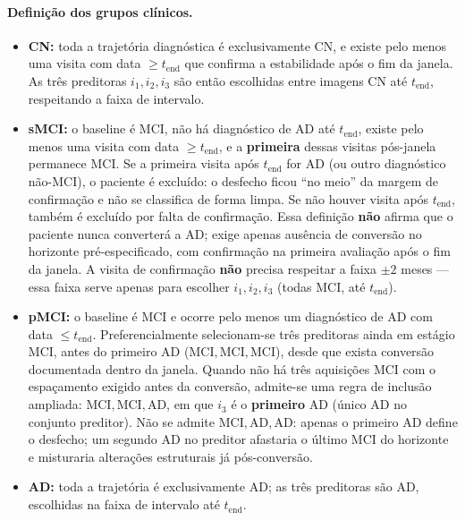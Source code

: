 \documentclass[review]{elsarticle}
\begin{document}
	\paragraph{Definição dos grupos clínicos.}
	\begin{itemize}
		\item \textbf{CN:} toda a trajetória diagnóstica é exclusivamente CN, e existe pelo menos uma visita com data $\ge t_{\mathrm{end}}$ que confirma a estabilidade após o fim da janela.
		As três preditoras $i_1,i_2,i_3$ são então escolhidas entre imagens CN até $t_{\mathrm{end}}$, respeitando a faixa de intervalo.
		
		\item \textbf{sMCI:} o baseline é MCI, não há diagnóstico de AD até $t_{\mathrm{end}}$, existe pelo menos uma visita com data $\ge t_{\mathrm{end}}$, e a \textbf{primeira} dessas visitas pós-janela permanece MCI.
		Se a primeira visita após $t_{\mathrm{end}}$ for AD (ou outro diagnóstico não-MCI), o paciente é excluído: o desfecho ficou ``no meio'' da margem de confirmação e não se classifica de forma limpa.
		Se não houver visita após $t_{\mathrm{end}}$, também é excluído por falta de confirmação.
		Essa definição \textbf{não} afirma que o paciente nunca converterá a AD; exige apenas ausência de conversão no horizonte pré-especificado, com confirmação na primeira avaliação após o fim da janela.
		A visita de confirmação \textbf{não} precisa respeitar a faixa $\pm 2$ meses --- essa faixa serve apenas para escolher $i_1,i_2,i_3$ (todas MCI, até $t_{\mathrm{end}}$).
		
		\item \textbf{pMCI:} o baseline é MCI e ocorre pelo menos um diagnóstico de AD com data $\le t_{\mathrm{end}}$.
		Preferencialmente selecionam-se três preditoras ainda em estágio MCI, antes do primeiro AD ($\mathrm{MCI},\mathrm{MCI},\mathrm{MCI}$), desde que exista conversão documentada dentro da janela.
		Quando não há três aquisições MCI com o espaçamento exigido antes da conversão, admite-se uma regra de inclusão ampliada: $\mathrm{MCI},\mathrm{MCI},\mathrm{AD}$, em que $i_3$ é o \textbf{primeiro} AD (único AD no conjunto preditor).
		Não se admite $\mathrm{MCI},\mathrm{AD},\mathrm{AD}$: apenas o primeiro AD define o desfecho; um segundo AD no preditor afastaria o último MCI do horizonte e misturaria alterações estruturais já pós-conversão.
		
		\item \textbf{AD:} toda a trajetória é exclusivamente AD; as três preditoras são AD, escolhidas na faixa de intervalo até $t_{\mathrm{end}}$.
	\end{itemize}
	
\end{document}

